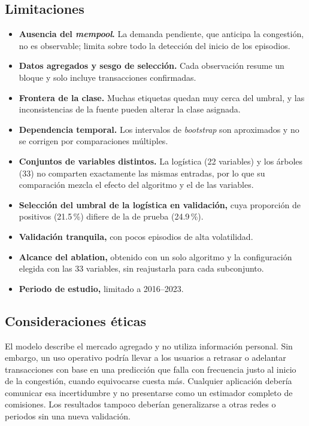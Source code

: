 \documentclass[conference]{IEEEtran}
\begin{document}
\subsection{Limitaciones}
\begin{itemize}
\item \textbf{Ausencia del \textit{mempool}.} La demanda pendiente, que anticipa la congestión, no es observable; limita sobre todo la detección del inicio de los episodios.
\item \textbf{Datos agregados y sesgo de selección.} Cada observación resume un bloque y solo incluye transacciones confirmadas.
\item \textbf{Frontera de la clase.} Muchas etiquetas quedan muy cerca del umbral, y las inconsistencias de la fuente pueden alterar la clase asignada.
\item \textbf{Dependencia temporal.} Los intervalos de \textit{bootstrap} son aproximados y no se corrigen por comparaciones múltiples.
\item \textbf{Conjuntos de variables distintos.} La logística (22 variables) y los árboles (33) no comparten exactamente las mismas entradas, por lo que su comparación mezcla el efecto del algoritmo y el de las variables.
\item \textbf{Selección del umbral de la logística en validación,} cuya proporción de positivos (21.5\,\%) difiere de la de prueba (24.9\,\%).
\item \textbf{Validación tranquila,} con pocos episodios de alta volatilidad.
\item \textbf{Alcance del ablation,} obtenido con un solo algoritmo y la configuración elegida con las 33 variables, sin reajustarla para cada subconjunto.
\item \textbf{Periodo de estudio,} limitado a 2016--2023.
\end{itemize}

\subsection{Consideraciones éticas}
El modelo describe el mercado agregado y no utiliza información personal. Sin embargo, un uso operativo podría llevar a los usuarios a retrasar o adelantar transacciones con base en una predicción que falla con frecuencia justo al inicio de la congestión, cuando equivocarse cuesta más. Cualquier aplicación debería comunicar esa incertidumbre y no presentarse como un estimador completo de comisiones. Los resultados tampoco deberían generalizarse a otras redes o periodos sin una nueva validación.
\end{document}
